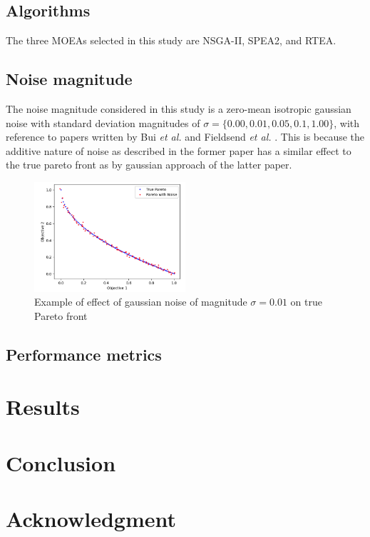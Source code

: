\documentclass[conference]{IEEEtran}
\begin{document}
\subsection{Algorithms}
The three MOEAs selected in this study are NSGA-II, SPEA2, and RTEA.
\subsection{Noise magnitude}
The noise magnitude considered in this study is a zero-mean isotropic gaussian noise with standard deviation magnitudes of $\sigma = \{0.00, 0.01, 0.05, 0.1, 1.00\}$, with reference to papers written by Bui \textit{et al.} \cite{bui2005} and Fieldsend \textit{et al.} \cite{fieldsend2015}. This is because the additive nature of noise as described in the former paper has a similar effect to the true pareto front as by gaussian approach of the latter paper.
\begin{figure}[h]
\includegraphics[width=0.5\textwidth]{noise_effect}
\caption{Example of effect of gaussian noise of magnitude $\sigma = 0.01$ on true Pareto front}
\centering
\end{figure}

\subsection{Performance metrics}

\section{Results}

\section{Conclusion}

\section*{Acknowledgment}
\end{document}
